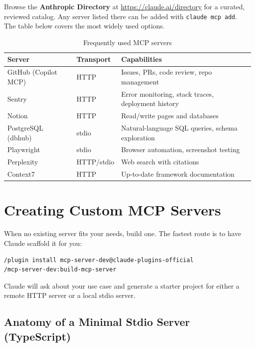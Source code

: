 
Browse the \textbf{Anthropic Directory} at \url{https://claude.ai/directory}
for a curated, reviewed catalog. Any server listed there can be added with
\texttt{claude mcp add}. The table below covers the most widely used options.

\begin{table}[ht]
\centering
\caption{Frequently used MCP servers}
\label{tab:mcp-popular}
\begin{tabularx}{\textwidth}{llX}
\toprule
\textbf{Server} & \textbf{Transport} & \textbf{Capabilities} \\
\midrule
GitHub (Copilot MCP) & HTTP & Issues, PRs, code review, repo management \\
Sentry               & HTTP & Error monitoring, stack traces, deployment history \\
Notion               & HTTP & Read/write pages and databases \\
PostgreSQL (dbhub)   & stdio & Natural-language SQL queries, schema exploration \\
Playwright           & stdio & Browser automation, screenshot testing \\
Perplexity           & HTTP/stdio & Web search with citations \\
Context7             & HTTP & Up-to-date framework documentation \\
\bottomrule
\end{tabularx}
\end{table}

\section{Creating Custom MCP Servers}
\label{sec:mcp-custom}


When no existing server fits your needs, build one. The fastest route is to
have Claude scaffold it for you:

\begin{lstlisting}[language=bash,caption={Scaffolding a new MCP server with the dev plugin}]
/plugin install mcp-server-dev@claude-plugins-official
/mcp-server-dev:build-mcp-server
\end{lstlisting}

Claude will ask about your use case and generate a starter project for either
a remote HTTP server or a local stdio server.

\subsection{Anatomy of a Minimal Stdio Server (TypeScript)}

